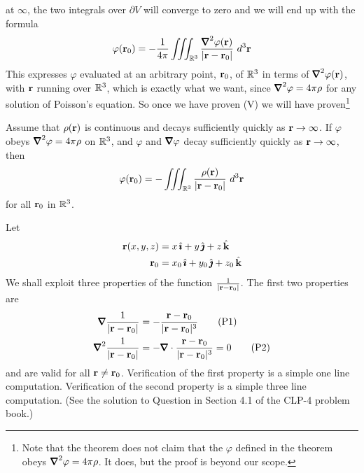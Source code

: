 at $\infty$, the two integrals over $\partial V$ will converge to zero and
we will end up with the formula 
\begin{equation*}
\varphi(\vr_0)=-\frac{1}{4\pi}
\tripInt_{\bbbr^3}\frac{ \vnabla^2\varphi(\vr)}{|\vr-\vr_0|}\ d^3\vr
\end{equation*}
This expresses $\varphi$ evaluated at an
arbitrary point, $\mathbf{r}_0$, of $\mathbb{R}^3$ in terms of $\vnabla^2\varphi(\vr)$, 
with $\mathbf{r}$ running over $\mathbb{R}^3$, which is exactly what we want, since
$\vnabla^2\varphi = 4\pi\rho$ for any solution of Poisson's equation.
So once we have proven (V) we will have proven\footnote{Note that the theorem
does not claim that the $\varphi$ defined in the theorem obeys
$\vnabla^2\varphi = 4\pi\rho$. It does, but the proof is beyond our scope.}
\begin{theorem}\label{thm:PoissonSoln}
Assume that $\rho(\mathbf{r})$ is continuous and decays sufficiently quickly as
$\mathbf{r}\rightarrow\infty$.  If $\varphi$ obeys
$\vnabla^2\varphi = 4\pi\rho$ on $\mathbb{R}^3$, and $\varphi$ 
and $\vnabla\varphi$ decay sufficiently quickly as $\mathbf{r}\rightarrow\infty$, then
\begin{equation*}
\varphi(\mathbf{r}_0)=
-\iiint_{\mathbb{R}^3}\frac{ \rho(\mathbf{r})}{|\mathbf{r}-\mathbf{r}_0|}\ d^3\mathbf{r}
\end{equation*}
for all $\mathbf{r}_0$ in $\mathbb{R}^3$.
\end{theorem}

Let 
\begin{align*}
\mathbf{r}(x,y,z)&=x\,\hat{\pmb{\imath}}+y\,\hat{\pmb{\jmath}}+z\,\hat{\mathbf{k}}\\
\mathbf{r}_0&=x_0\,\hat{\pmb{\imath}}+y_0\,\hat{\pmb{\jmath}}+z_0\,\hat{\mathbf{k}}
\end{align*}
We shall exploit three properties of the function
$\frac{1}{|\mathbf{r}-\mathbf{r}_0|}$. The first two properties are
\begin{align}
\vnabla \frac{1}{|\vr-\vr_0|} &=-\frac{\vr-\vr_0}{|\vr-\vr_0|^3}\tag{P1}\\
\vnabla^2 \frac{1}{|\vr-\vr_0|} &=-\vnabla\cdot\frac{\vr-\vr_0}{|\vr-\vr_0|^3}
=0
\tag{P2}\end{align}
and are valid for all $\mathbf{r}\ne \mathbf{r}_0$. Verification of the first property is
a simple one line computation. Verification of the second property is
a simple three line computation. (See the solution to Question 
 in Section 4.1 of the CLP-4 problem book.)

